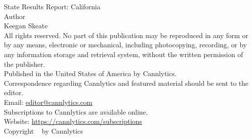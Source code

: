 \documentclass[../article.tex, 11pt]{subfiles}
\begin{document}
{\parindent0pt
{\Large State Results Report: California}\\[2\baselineskip]
{\Large Author \\[.5\baselineskip]}
\large Keegan Skeate \\[2.\baselineskip]

All rights reserved. No part of this publication may be reproduced in any form or by any means, electronic or mechanical, including photocopying, recording, or by any information storage and retrieval system, without the written permission of the publisher.\\[.25\baselineskip]

Published in the United States of America by Cannlytics.\\[.25\baselineskip]

Correspondence regarding Cannlytics and featured material should be sent to the editor.\\[.2\baselineskip] Email: \href{mailto:editor@cannlytics.com}{editor@cannlytics.com} \\[.25\baselineskip]

Subscriptions to Cannlytics are available online.\\[.2\baselineskip] Website: \href{https://cannlytics.com/subscriptions}{https://cannlytics.com/subscriptions}\\[.25\baselineskip]

\vspace*{2\baselineskip}
\vfill
{\normalsize Copyright \textcopyright ~\the\year{} by Cannlytics\\[\baselineskip]}

}
\end{document}
